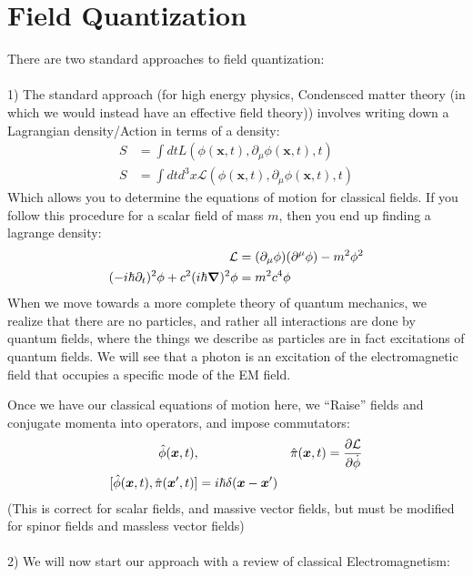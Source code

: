 \section{Field Quantization}
There are two standard approaches to field quantization:\\\\
1) The standard approach (for high energy physics, Condensced matter theory (in which we would instead have an effective field theory)) involves writing down a Lagrangian density/Action in terms of a density:
\begin{align*}
	S &= \int dt L(\phi(\bm{x},t),\partial_\mu \phi(\bm{x},t),t) \\
	S &= \int dt d^3 x \mathcal{L}(\phi(\bm{x},t),\partial_\mu \phi(\bm{x},t),t)
\end{align*}
Which allows you to determine the equations of motion for classical fields. If you follow this procedure for a scalar field of mass $m$, then you end up finding a lagrange density:
\begin{align*}
	\mathcal{L} &= (\partial_\mu\phi)(\partial^\mu\phi) - m^2\phi^2 \\
	(-i\hbar\partial_t)^2\phi + c^2 (i\hbar\bm{\nabla})^2\phi &= m^2c^4\phi
\end{align*}
When we move towards a more complete theory of quantum mechanics, we realize that there are no particles, and rather all interactions are done by quantum fields, where the things we describe as particles are in fact excitations of quantum fields.
We will see that a photon is an excitation of the electromagnetic field that occupies a specific mode of the EM field.

Once we have our classical equations of motion here, we ``Raise'' fields and conjugate momenta into operators, and impose commutators:
\begin{align*}
	\hat{\phi}(\bm{x},t),&& \hat{\pi}(\bm{x},t) &= \frac{\partial \mathcal{L}}{\partial \dot{\phi}} \\
	[\hat{\phi}(\bm{x},t),\hat{\pi}(\bm{x}',t)] &= i\hbar\delta(\bm{x} - \bm{x}')
\end{align*}
(This is correct for scalar fields, and massive vector fields, but must be modified for spinor fields and massless vector fields)
\\\\
2) We will now start our approach with a review of classical Electromagnetism:
